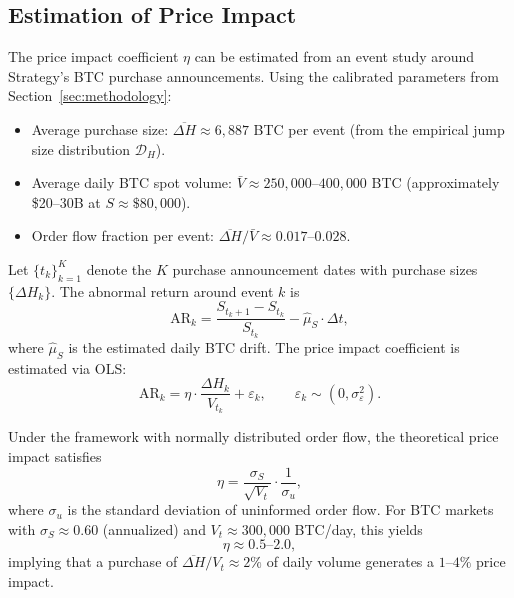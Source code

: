 \subsection{Estimation of Price Impact}\label{subsec:eta_estimate}

\begin{proposition}\label{prop:eta_est}
The price impact coefficient $\eta$ can be estimated from an event study
around Strategy's BTC purchase announcements.  Using the calibrated
parameters from Section~\ref{sec:methodology}:
\begin{itemize}
  \item Average purchase size: $\overline{\Delta H} \approx 6{,}887$ BTC
    per event (from the empirical jump size distribution $\mathcal{D}_H$).
  \item Average daily BTC spot volume:
    $\bar{V} \approx 250{,}000\text{--}400{,}000$ BTC
    (approximately \$20--30B at $S \approx \$80{,}000$).
  \item Order flow fraction per event:
    $\overline{\Delta H} / \bar{V} \approx 0.017\text{--}0.028$.
\end{itemize}
\end{proposition}

\begin{definition}\label{def:event_study}
Let $\{t_k\}_{k=1}^K$ denote the $K$ purchase announcement dates with
purchase sizes $\{\Delta H_k\}$.  The abnormal return around event $k$ is
\begin{equation}\label{eq:abnormal_return}
  \mathrm{AR}_k
  = \frac{S_{t_k + 1} - S_{t_k}}{S_{t_k}}
    - \hat{\mu}_S \cdot \Delta t,
\end{equation}
where $\hat{\mu}_S$ is the estimated daily BTC drift.  The price impact
coefficient is estimated via OLS:
\begin{equation}\label{eq:eta_ols}
  \mathrm{AR}_k = \eta \cdot \frac{\Delta H_k}{V_{t_k}} + \varepsilon_k,
  \qquad \varepsilon_k \sim (0, \sigma_\varepsilon^2).
\end{equation}
\end{definition}

\begin{proposition}\label{prop:eta_bounds}
Under the \citet{kyle1985continuous} framework with normally distributed
order flow, the theoretical price impact satisfies
\begin{equation}\label{eq:kyle_lambda}
  \eta = \frac{\sigma_S}{\sqrt{V_t}} \cdot \frac{1}{\sigma_u},
\end{equation}
where $\sigma_u$ is the standard deviation of uninformed order flow.
For BTC markets with $\sigma_S \approx 0.60$ (annualized) and
$V_t \approx 300{,}000$ BTC/day, this yields
\begin{equation}\label{eq:eta_calibrated}
  \eta \approx 0.5\text{--}2.0,
\end{equation}
implying that a purchase of $\overline{\Delta H} / V_t \approx 2\%$ of
daily volume generates a $1\text{--}4\%$ price impact.
\end{proposition}

